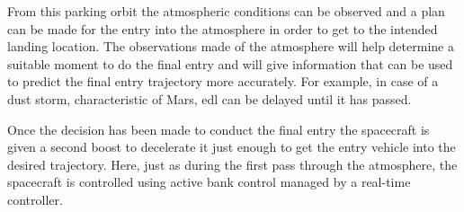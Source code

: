 From this parking orbit the atmospheric conditions can be observed and a plan can be made for the entry into the atmosphere in order to get to the intended landing location. The observations made of the atmosphere will help determine a suitable moment to do the final entry and will give information that can be used to predict the final entry trajectory more accurately. For example, in case of a dust storm, characteristic of Mars, \acrfull{edl} can be delayed until it has passed.

Once the decision has been made to conduct the final entry the spacecraft is given a second boost to decelerate it just enough to get the entry vehicle into the desired trajectory. Here, just as during the first pass through the atmosphere, the spacecraft is controlled using active bank control managed by a real-time controller. %